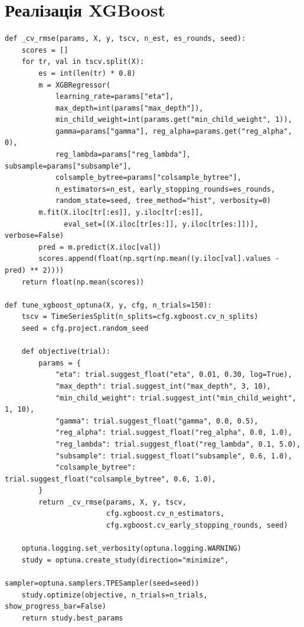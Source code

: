 \documentclass{bachelor_thesis}
\begin{document}
\section{Реалізація XGBoost}
\label{sec:appendix_xgb}

\begin{lstlisting}[caption={Підбір гіперпараметрів та фінальне навчання XGBoost}]
def _cv_rmse(params, X, y, tscv, n_est, es_rounds, seed):
    scores = []
    for tr, val in tscv.split(X):
        es = int(len(tr) * 0.8)
        m = XGBRegressor(
            learning_rate=params["eta"],
            max_depth=int(params["max_depth"]),
            min_child_weight=int(params.get("min_child_weight", 1)),
            gamma=params["gamma"], reg_alpha=params.get("reg_alpha", 0),
            reg_lambda=params["reg_lambda"], subsample=params["subsample"],
            colsample_bytree=params["colsample_bytree"],
            n_estimators=n_est, early_stopping_rounds=es_rounds,
            random_state=seed, tree_method="hist", verbosity=0)
        m.fit(X.iloc[tr[:es]], y.iloc[tr[:es]],
              eval_set=[(X.iloc[tr[es:]], y.iloc[tr[es:]])], verbose=False)
        pred = m.predict(X.iloc[val])
        scores.append(float(np.sqrt(np.mean((y.iloc[val].values - pred) ** 2))))
    return float(np.mean(scores))

def tune_xgboost_optuna(X, y, cfg, n_trials=150):
    tscv = TimeSeriesSplit(n_splits=cfg.xgboost.cv_n_splits)
    seed = cfg.project.random_seed

    def objective(trial):
        params = {
            "eta": trial.suggest_float("eta", 0.01, 0.30, log=True),
            "max_depth": trial.suggest_int("max_depth", 3, 10),
            "min_child_weight": trial.suggest_int("min_child_weight", 1, 10),
            "gamma": trial.suggest_float("gamma", 0.0, 0.5),
            "reg_alpha": trial.suggest_float("reg_alpha", 0.0, 1.0),
            "reg_lambda": trial.suggest_float("reg_lambda", 0.1, 5.0),
            "subsample": trial.suggest_float("subsample", 0.6, 1.0),
            "colsample_bytree": trial.suggest_float("colsample_bytree", 0.6, 1.0),
        }
        return _cv_rmse(params, X, y, tscv,
                        cfg.xgboost.cv_n_estimators,
                        cfg.xgboost.cv_early_stopping_rounds, seed)

    optuna.logging.set_verbosity(optuna.logging.WARNING)
    study = optuna.create_study(direction="minimize",
                                sampler=optuna.samplers.TPESampler(seed=seed))
    study.optimize(objective, n_trials=n_trials, show_progress_bar=False)
    return study.best_params


\end{lstlisting}
\end{document}
